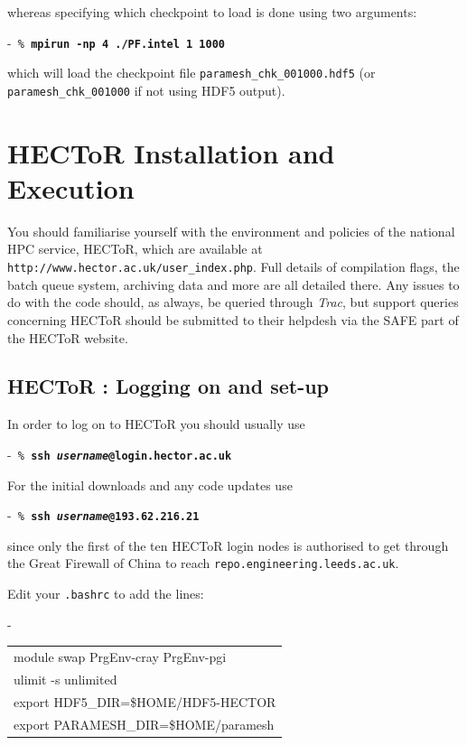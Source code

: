 \documentclass[paper=a4, fontsize=11pt,twoside,bibtotoc]{scrartcl}		%
\newenvironment{codebox}{\begin{center}\begin{MakeFramed}{\hsize0.99\linewidth\advance\hsize-\width\FrameRestore}\tt}{\end{MakeFramed}\end{center}}
\newenvironment{filebox}{\begin{center}\begin{MakeFramed}{\hsize0.99\linewidth\advance\hsize-\width\FrameRestore}\tt\begin{tabular}{l}}{\end{tabular}\end{MakeFramed}\end{center}}
\newcommand{\prompt}[1]{\textsl{\%} \textbf{#1}}
\begin{document}
\noindent
whereas specifying which checkpoint to load is done using two arguments:
\begin{codebox}
	\prompt{mpirun -np 4 ./PF.intel 1 1000}
\end{codebox}
which will load the checkpoint file \texttt{paramesh\_chk\_001000.hdf5} (or \texttt{paramesh\_chk\_001000} if not using HDF5 output).



\section{HECToR Installation and Execution}
								\label{SEC_Hector}

You should familiarise yourself with the environment and policies of the national HPC service, HECToR, which are available at 
\texttt{http://www.hector.ac.uk/user\_index.php}.  Full details of compilation flags, the batch queue system, archiving data and more are all detailed there.  
Any issues to do with the code should, as always, be queried through \textsl{Trac}, but support queries concerning HECToR should be submitted to their helpdesh via 
the SAFE part of the HECToR website.

\subsection[Logging on and set-up]{HECToR : Logging on and set-up}

In order to log on to HECToR you should usually use 
\begin{codebox}
	\prompt{ssh \textsl{username}@login.hector.ac.uk}
\end{codebox}
For the initial downloads and any code updates use
\begin{codebox}
	\prompt{ssh \textsl{username}@193.62.216.21}
\end{codebox}
since only the first of the ten HECToR login nodes is authorised to get through the Great Firewall of China to reach \texttt{repo.engineering.leeds.ac.uk}.

Edit your \texttt{.bashrc} to add the lines:
\begin{filebox}
	module swap PrgEnv-cray PrgEnv-pgi\\

	ulimit -s unlimited\\

	export HDF5\_DIR=\$HOME/HDF5-HECTOR\\

	export PARAMESH\_DIR=\$HOME/paramesh\\
\end{filebox}
\end{document}
